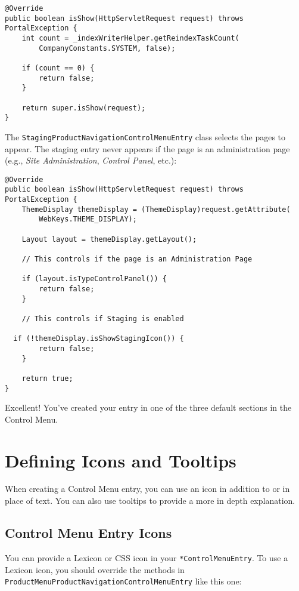 \begin{enumerate}
\begin{verbatim}
@Override
public boolean isShow(HttpServletRequest request) throws PortalException {
    int count = _indexWriterHelper.getReindexTaskCount(
        CompanyConstants.SYSTEM, false);

    if (count == 0) {
        return false;
    }

    return super.isShow(request);
}
\end{verbatim}

  The \texttt{StagingProductNavigationControlMenuEntry} class selects
  the pages to appear. The staging entry never appears if the page is an
  administration page (e.g., \emph{Site Administration}, \emph{Control
  Panel}, etc.):

\begin{verbatim}
@Override
public boolean isShow(HttpServletRequest request) throws PortalException {
    ThemeDisplay themeDisplay = (ThemeDisplay)request.getAttribute(
        WebKeys.THEME_DISPLAY);

    Layout layout = themeDisplay.getLayout();

    // This controls if the page is an Administration Page

    if (layout.isTypeControlPanel()) {
        return false;
    }

    // This controls if Staging is enabled

  if (!themeDisplay.isShowStagingIcon()) {
        return false;
    }

    return true;
}
\end{verbatim}
\end{enumerate}

Excellent! You've created your entry in one of the three default
sections in the Control Menu.

\chapter{Defining Icons and Tooltips}\label{defining-icons-and-tooltips}

When creating a Control Menu entry, you can use an icon in addition to
or in place of text. You can also use tooltips to provide a more in
depth explanation.

\section{Control Menu Entry Icons}\label{control-menu-entry-icons}

You can provide a Lexicon or CSS icon in your
\texttt{*ControlMenuEntry}. To use a Lexicon icon, you should override
the methods in \texttt{ProductMenuProductNavigationControlMenuEntry}
like this one:

